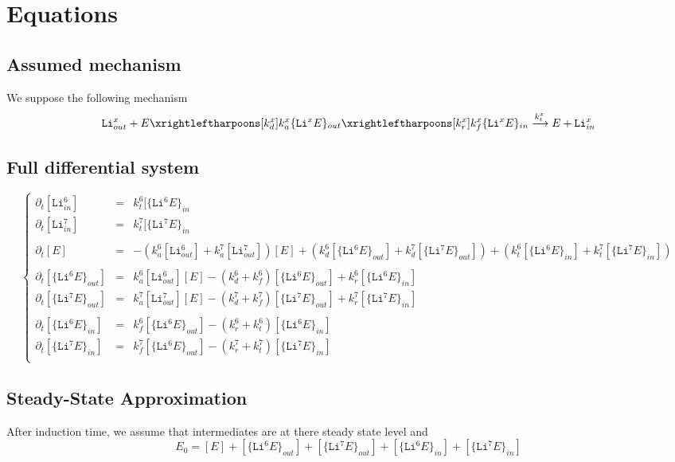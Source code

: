 \documentclass[aps,onecolumn]{revtex4}
\newcommand{\mychem}[1]{\mathtt{#1}}
\begin{document}
\section{Equations}
\subsection{Assumed mechanism}
We suppose the following mechanism
\begin{equation}
	\mychem{Li}^{x}_{out} + E \xrightleftharpoons[k_d^{x}]{k_a^{x}}
	\lbrace\mychem{Li}^xE\rbrace_{out} 
	\xrightleftharpoons[k_r^{x}]{k_f^{x}} 
	\lbrace\mychem{Li}^xE\rbrace_{in}
	\xrightarrow{k_t^x} E + \mychem{Li}^{x}_{in}
\end{equation}

\subsection{Full differential system}
\begin{equation}
	\left\lbrace
	\begin{array}{ccl}
	\partial_t [\mychem{Li}^6_{in}] & = &k_t^6[\lbrace\mychem{Li}^6E\rbrace_{in}  \\
	\partial_t [\mychem{Li}^7_{in}] & = &k_t^7[\lbrace\mychem{Li}^7E\rbrace_{in}  \\
	\\
	\partial_t [E] & = &
	-\left(k_a^6[\mychem{Li}^6_{out}]+k_a^7[\mychem{Li}^7_{out}]\right)[E] 
	+\left(k_d^6[\lbrace\mychem{Li}^6E\rbrace_{out}]+k_d^7[\lbrace\mychem{Li}^7E\rbrace_{out}]\right)
	+\left(k_t^6[\lbrace\mychem{Li}^6E\rbrace_{in} ]+k_t^7[\lbrace\mychem{Li}^7E\rbrace_{in} ]\right)
	\\
	\\
	\partial_t[\lbrace\mychem{Li}^6E\rbrace_{out}] & = & 
	k_a^6[\mathtt{Li}^6_{out}][E] - (k_d^6+k_f^6) [\lbrace\mychem{Li}^6E\rbrace_{out}]
	+k_r^6[\lbrace\mychem{Li}^6E\rbrace_{in}]
	\\
	\partial_t[\lbrace\mychem{Li}^7E\rbrace_{out}] & = & 
	k_a^7[\mathtt{Li}^7_{out}][E] - (k_d^7+k_f^7) [\lbrace\mychem{Li}^7E\rbrace_{out}]
	+k_r^7[\lbrace\mychem{Li}^7E\rbrace_{in}]
	\\
	\\
	\partial_t[\lbrace\mychem{Li}^6E\rbrace_{in}] & = & 
	k_f^6 [\lbrace\mychem{Li}^6E\rbrace_{out}] - (k_r^6+k_t^6) [\lbrace\mychem{Li}^6E\rbrace_{in}]
	\\
	\partial_t[\lbrace\mychem{Li}^7E\rbrace_{in}] & = & 
	k_f^7 [\lbrace\mychem{Li}^6E\rbrace_{out}] - (k_r^7+k_t^7) [\lbrace\mychem{Li}^7E\rbrace_{in}]
	\\
	\end{array}
	\right. 
\end{equation}

\subsection{Steady-State Approximation}
After induction time, we assume that intermediates are at there steady state level
and
\begin{equation}
	E_0 = [E] 
	+ [\lbrace\mychem{Li}^6E\rbrace_{out}]
	+ [\lbrace\mychem{Li}^7E\rbrace_{out}]
	+ [\lbrace\mychem{Li}^6E\rbrace_{in}]
	+ [\lbrace\mychem{Li}^7E\rbrace_{in}]
\end{equation}
\end{document}
